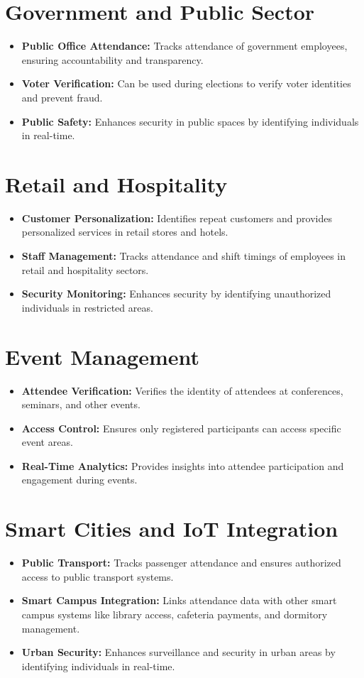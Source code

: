 \documentclass[openany]{report}
\begin{document}
\section{Government and Public Sector}
\begin{itemize}
    \item \textbf{Public Office Attendance:} Tracks attendance of government employees, ensuring accountability and transparency.
    \item \textbf{Voter Verification:} Can be used during elections to verify voter identities and prevent fraud.
    \item \textbf{Public Safety:} Enhances security in public spaces by identifying individuals in real-time.
\end{itemize}

\section{Retail and Hospitality}
\begin{itemize}
    \item \textbf{Customer Personalization:} Identifies repeat customers and provides personalized services in retail stores and hotels.
    \item \textbf{Staff Management:} Tracks attendance and shift timings of employees in retail and hospitality sectors.
    \item \textbf{Security Monitoring:} Enhances security by identifying unauthorized individuals in restricted areas.
\end{itemize}

\section{Event Management}
\begin{itemize}
    \item \textbf{Attendee Verification:} Verifies the identity of attendees at conferences, seminars, and other events.
    \item \textbf{Access Control:} Ensures only registered participants can access specific event areas.
    \item \textbf{Real-Time Analytics:} Provides insights into attendee participation and engagement during events.
\end{itemize}

\section{Smart Cities and IoT Integration}
\begin{itemize}
    \item \textbf{Public Transport:} Tracks passenger attendance and ensures authorized access to public transport systems.
    \item \textbf{Smart Campus Integration:} Links attendance data with other smart campus systems like library access, cafeteria payments, and dormitory management.
    \item \textbf{Urban Security:} Enhances surveillance and security in urban areas by identifying individuals in real-time.
\end{itemize}
\end{document}
